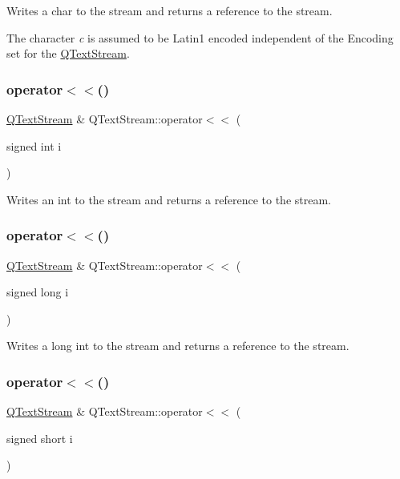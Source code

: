Writes a {\ttfamily char} to the stream and returns a reference to the stream.

The character {\itshape c} is assumed to be Latin1 encoded independent of the Encoding set for the \mbox{\hyperlink{class_q_text_stream}{Q\+Text\+Stream}}. \mbox{\label{class_q_text_stream_af4d8f73d592e7dbf1009381c3795bc0b}} 
\subsubsection{\texorpdfstring{operator$<$$<$()}{operator<<()}\hspace{0.1cm}{\footnotesize\ttfamily [8/14]}}
{\footnotesize\ttfamily \mbox{\hyperlink{class_q_text_stream}{Q\+Text\+Stream}} \& Q\+Text\+Stream\+::operator$<$$<$ (\begin{DoxyParamCaption}\item[{signed int}]{i }\end{DoxyParamCaption})}

Writes an {\ttfamily int} to the stream and returns a reference to the stream. \mbox{\label{class_q_text_stream_a35f51b32c584d1e703e1127c8273510d}} 
\subsubsection{\texorpdfstring{operator$<$$<$()}{operator<<()}\hspace{0.1cm}{\footnotesize\ttfamily [9/14]}}
{\footnotesize\ttfamily \mbox{\hyperlink{class_q_text_stream}{Q\+Text\+Stream}} \& Q\+Text\+Stream\+::operator$<$$<$ (\begin{DoxyParamCaption}\item[{signed long}]{i }\end{DoxyParamCaption})}

Writes a {\ttfamily long} {\ttfamily int} to the stream and returns a reference to the stream. \mbox{\label{class_q_text_stream_a09fa4090716c81548496f5f344c61a61}} 
\subsubsection{\texorpdfstring{operator$<$$<$()}{operator<<()}\hspace{0.1cm}{\footnotesize\ttfamily [10/14]}}
{\footnotesize\ttfamily \mbox{\hyperlink{class_q_text_stream}{Q\+Text\+Stream}} \& Q\+Text\+Stream\+::operator$<$$<$ (\begin{DoxyParamCaption}\item[{signed short}]{i }\end{DoxyParamCaption})}

